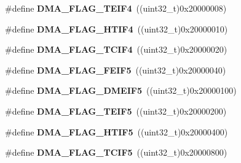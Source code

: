 \begin{DoxyCompactItemize}
\item 
\hypertarget{group___d_m_a__flags__definition_ga0216244c5386117a965ef6833b86984e}{\#define {\bfseries D\-M\-A\-\_\-\-F\-L\-A\-G\-\_\-\-T\-E\-I\-F4}~((uint32\-\_\-t)0x20000008)}\label{group___d_m_a__flags__definition_ga0216244c5386117a965ef6833b86984e}

\item 
\hypertarget{group___d_m_a__flags__definition_gac1f371142dd0c1a5a19d8ad2cf1d2f2a}{\#define {\bfseries D\-M\-A\-\_\-\-F\-L\-A\-G\-\_\-\-H\-T\-I\-F4}~((uint32\-\_\-t)0x20000010)}\label{group___d_m_a__flags__definition_gac1f371142dd0c1a5a19d8ad2cf1d2f2a}

\item 
\hypertarget{group___d_m_a__flags__definition_gaa2a470b95dc9084de45009c600e8cf1d}{\#define {\bfseries D\-M\-A\-\_\-\-F\-L\-A\-G\-\_\-\-T\-C\-I\-F4}~((uint32\-\_\-t)0x20000020)}\label{group___d_m_a__flags__definition_gaa2a470b95dc9084de45009c600e8cf1d}

\item 
\hypertarget{group___d_m_a__flags__definition_ga40621c1df90e9e1ebfb4815df09a2469}{\#define {\bfseries D\-M\-A\-\_\-\-F\-L\-A\-G\-\_\-\-F\-E\-I\-F5}~((uint32\-\_\-t)0x20000040)}\label{group___d_m_a__flags__definition_ga40621c1df90e9e1ebfb4815df09a2469}

\item 
\hypertarget{group___d_m_a__flags__definition_ga70a0d9684bfd6e6ef2cce31fc8e33512}{\#define {\bfseries D\-M\-A\-\_\-\-F\-L\-A\-G\-\_\-\-D\-M\-E\-I\-F5}~((uint32\-\_\-t)0x20000100)}\label{group___d_m_a__flags__definition_ga70a0d9684bfd6e6ef2cce31fc8e33512}

\item 
\hypertarget{group___d_m_a__flags__definition_ga64ee170cb2d0fbe5daa6d3166c65190d}{\#define {\bfseries D\-M\-A\-\_\-\-F\-L\-A\-G\-\_\-\-T\-E\-I\-F5}~((uint32\-\_\-t)0x20000200)}\label{group___d_m_a__flags__definition_ga64ee170cb2d0fbe5daa6d3166c65190d}

\item 
\hypertarget{group___d_m_a__flags__definition_ga005ff333f9f114f5966f35b90df0ff9a}{\#define {\bfseries D\-M\-A\-\_\-\-F\-L\-A\-G\-\_\-\-H\-T\-I\-F5}~((uint32\-\_\-t)0x20000400)}\label{group___d_m_a__flags__definition_ga005ff333f9f114f5966f35b90df0ff9a}

\item 
\hypertarget{group___d_m_a__flags__definition_ga50cb345a0bb8bde37228b0a1d5becc4c}{\#define {\bfseries D\-M\-A\-\_\-\-F\-L\-A\-G\-\_\-\-T\-C\-I\-F5}~((uint32\-\_\-t)0x20000800)}\label{group___d_m_a__flags__definition_ga50cb345a0bb8bde37228b0a1d5becc4c}


\end{DoxyCompactItemize}
